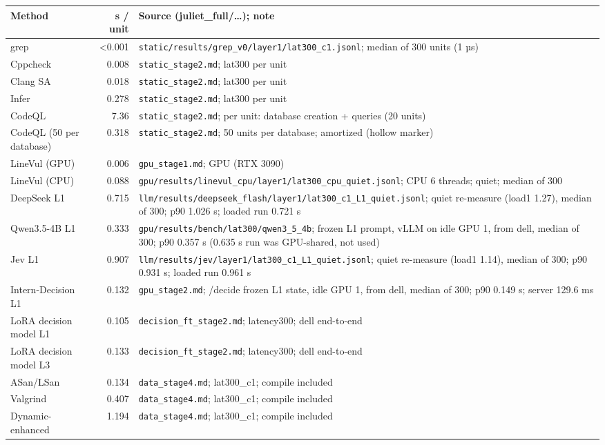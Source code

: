 \begin{tabular}{@{}lrl@{}}
\toprule
Method & s / unit & Source (juliet\_full/\ldots); note \\
\midrule
grep & <0.001 & \texttt{static/results/grep\_v0/layer1/lat300\_c1.jsonl}; median of 300 units (1 µs) \\
Cppcheck & 0.008 & \texttt{static\_stage2.md}; lat300 per unit \\
Clang SA & 0.018 & \texttt{static\_stage2.md}; lat300 per unit \\
Infer & 0.278 & \texttt{static\_stage2.md}; lat300 per unit \\
CodeQL & 7.36 & \texttt{static\_stage2.md}; per unit: database creation + queries (20 units) \\
CodeQL (50 per database) & 0.318 & \texttt{static\_stage2.md}; 50 units per database; amortized (hollow marker) \\
LineVul (GPU) & 0.006 & \texttt{gpu\_stage1.md}; GPU (RTX 3090) \\
LineVul (CPU) & 0.088 & \texttt{gpu/results/linevul\_cpu/layer1/lat300\_cpu\_quiet.jsonl}; CPU 6 threads; quiet; median of 300 \\
DeepSeek L1 & 0.715 & \texttt{llm/results/deepseek\_flash/layer1/lat300\_c1\_L1\_quiet.jsonl}; quiet re-measure (load1 1.27), median of 300; p90 1.026 s; loaded run 0.721 s \\
Qwen3.5-4B L1 & 0.333 & \texttt{gpu/results/bench/lat300/qwen3\_5\_4b}; frozen L1 prompt, vLLM on idle GPU 1, from dell, median of 300; p90 0.357 s (0.635 s run was GPU-shared, not used) \\
Jev L1 & 0.907 & \texttt{llm/results/jev/layer1/lat300\_c1\_L1\_quiet.jsonl}; quiet re-measure (load1 1.14), median of 300; p90 0.931 s; loaded run 0.961 s \\
Intern-Decision L1 & 0.132 & \texttt{gpu\_stage2.md}; /decide frozen L1 state, idle GPU 1, from dell, median of 300; p90 0.149 s; server 129.6 ms \\
LoRA decision model L1 & 0.105 & \texttt{decision\_ft\_stage2.md}; latency300; dell end-to-end \\
LoRA decision model L3 & 0.133 & \texttt{decision\_ft\_stage2.md}; latency300; dell end-to-end \\
ASan/LSan & 0.134 & \texttt{data\_stage4.md}; lat300\_c1; compile included \\
Valgrind & 0.407 & \texttt{data\_stage4.md}; lat300\_c1; compile included \\
Dynamic-enhanced & 1.194 & \texttt{data\_stage4.md}; lat300\_c1; compile included \\
\bottomrule
\end{tabular}
